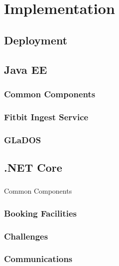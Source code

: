 \chapter{Implementation}

\section{Deployment}

\section{Java EE}
    \subsection{Common Components}
    	

    \subsection{Fitbit Ingest Service}
        

    \subsection{GLaDOS}
    	

\section{.NET Core}
    \subsection{}{Common Components}
    	
    \subsection{Booking Facilities}
    	
    \subsection{Challenges}
    	
    \subsection{Communications}
    	
